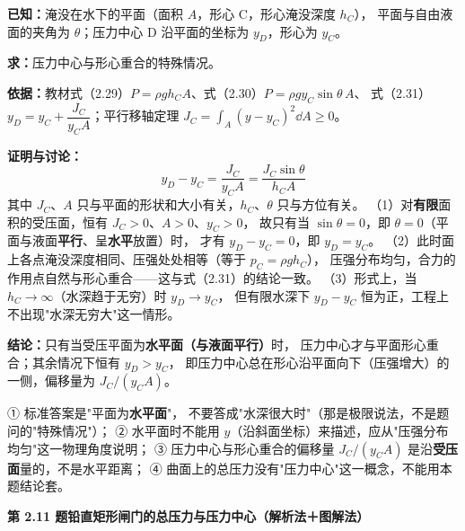 \begin{jie}
\textbf{已知：}淹没在水下的平面（面积 $A$，形心 C，形心淹没深度 $h_C$），
平面与自由液面的夹角为 $\theta$；压力中心 D 沿平面的坐标为 $y_D$，形心为 $y_C$。

\textbf{求：}压力中心与形心重合的特殊情况。

\textbf{依据：}教材式（2.29）$P=\rho gh_CA$、式（2.30）$P=\rho gy_C\sin\theta\,A$、
式（2.31）$y_D=y_C+\dfrac{J_C}{y_CA}$；平行移轴定理 $J_C=\displaystyle\int_A\left(y-y_C\right)^2\dd A\ge0$。

\textbf{证明与讨论：}
\[ y_D-y_C=\frac{J_C}{y_CA}=\frac{J_C\sin\theta}{h_CA} \]
其中 $J_C$、$A$ 只与平面的形状和大小有关，$h_C$、$\theta$ 只与方位有关。
（1）对\textbf{有限}面积的受压面，恒有 $J_C>0$、$A>0$、$y_C>0$，
故只有当 $\sin\theta=0$，即 $\theta=0$（平面与液面\textbf{平行}、呈\textbf{水平}放置）时，
才有 $y_D-y_C=0$，即 $y_D=y_C$。
（2）此时面上各点淹没深度相同、压强处处相等（等于 $p_C=\rho gh_C$），
压强分布均匀，合力的作用点自然与形心重合——这与式（2.31）的结论一致。
（3）形式上，当 $h_C\to\infty$（水深趋于无穷）时 $y_D\to y_C$，
但有限水深下 $y_D-y_C$ 恒为正，工程上不出现"水深无穷大"这一情形。

\textbf{结论：}只有当受压平面为\textbf{水平面（与液面平行）}时，
压力中心才与平面形心重合；其余情况下恒有 $y_D>y_C$，
即压力中心总在形心沿平面向下（压强增大）的一侧，偏移量为 $J_C/(y_CA)$。
\end{jie}

\begin{yicuo}
① 标准答案是"平面为\textbf{水平面}"，
不要答成"水深很大时"（那是极限说法，不是题问的"特殊情况"）；
② 水平面时不能用 $y$（沿斜面坐标）来描述，应从"压强分布均匀"这一物理角度说明；
③ 压力中心与形心重合的偏移量 $J_C/(y_CA)$ 是沿\textbf{受压面}量的，不是水平距离；
④ 曲面上的总压力没有"压力中心"这一概念，不能用本题结论套。
\end{yicuo}

\noindent\textbf{第 2.11 题\quad 铅直矩形闸门的总压力与压力中心（解析法＋图解法）}

